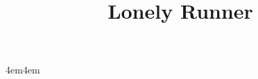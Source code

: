 \documentclass{article}
\title{Lonely Runner}
\author{}
\date{}
\newcommand{\aw}[1]{\begin{adjustwidth}{{#1}em}{{#1}em}}    %
\newcommand{\eaw}{\end{adjustwidth}}                        %
\begin{document}
\maketitle




\aw{4}
\eaw

\newpage
\end{document}
